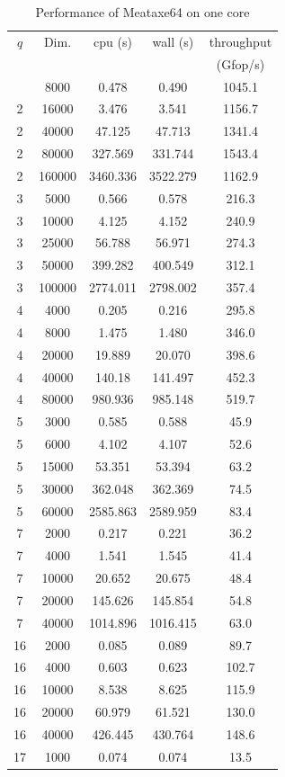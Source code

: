 \documentclass{deliverablereport}
\begin{document}
\begin{small}
\begin{center}
  \begin{longtable}{|c|c|c|c|c|}
    \caption[]{Performance of Meataxe64 on one core}\label{fig:matmult:mtx64}\\
    \hline
    $q$&Dim.&cpu (s)&wall (s) &throughput\\
    &&&&(Gfop/s)\\
    \hline
    \endhead
    \hline
    \endfoot
2&8000&0.478&0.490&1045.1\\
2&16000&3.476&3.541&1156.7\\
2&40000&47.125&47.713&1341.4\\
2&80000&327.569&331.744&1543.4\\
2&160000&3460.336&3522.279&1162.9\\
3&5000&0.566&0.578&216.3\\
3&10000&4.125&4.152&240.9\\
3&25000&56.788&56.971&274.3\\
3&50000&399.282&400.549&312.1\\
3&100000&2774.011&2798.002&357.4\\
4&4000&0.205&0.216&295.8\\
4&8000&1.475&1.480&346.0\\
4&20000&19.889&20.070&398.6\\
4&40000&140.18&141.497&452.3\\
4&80000&980.936&985.148&519.7\\
5&3000&0.585&0.588&45.9\\
5&6000&4.102&4.107&52.6\\
5&15000&53.351&53.394&63.2\\
5&30000&362.048&362.369&74.5\\
5&60000&2585.863&2589.959&83.4\\
7&2000&0.217&0.221&36.2\\
7&4000&1.541&1.545&41.4\\
7&10000&20.652&20.675&48.4\\
7&20000&145.626&145.854&54.8\\
7&40000&1014.896&1016.415&63.0\\
16&2000&0.085&0.089&89.7\\
16&4000&0.603&0.623&102.7\\
16&10000&8.538&8.625&115.9\\
16&20000&60.979&61.521&130.0\\
16&40000&426.445&430.764&148.6\\
17&1000&0.074&0.074&13.5\\

\end{longtable}
\end{center}
\end{small}
\end{document}
